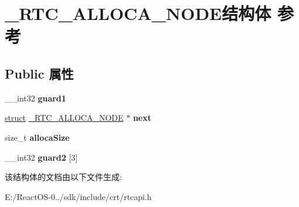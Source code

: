 \hypertarget{struct___r_t_c___a_l_l_o_c_a___n_o_d_e}{}\section{\+\_\+\+R\+T\+C\+\_\+\+A\+L\+L\+O\+C\+A\+\_\+\+N\+O\+D\+E结构体 参考}
\label{struct___r_t_c___a_l_l_o_c_a___n_o_d_e}
\subsection*{Public 属性}
\begin{DoxyCompactItemize}
\item 
\mbox{\label{struct___r_t_c___a_l_l_o_c_a___n_o_d_e_a725180efb9e8d2747a1202797eb1bbc5}} 
\+\_\+\+\_\+int32 {\bfseries guard1}
\item 
\mbox{\label{struct___r_t_c___a_l_l_o_c_a___n_o_d_e_a77f071fa3b7aed02e20b3eea51f4ad19}} 
\hyperlink{interfacestruct}{struct} \hyperlink{struct___r_t_c___a_l_l_o_c_a___n_o_d_e}{\+\_\+\+R\+T\+C\+\_\+\+A\+L\+L\+O\+C\+A\+\_\+\+N\+O\+DE} $\ast$ {\bfseries next}
\item 
\mbox{\label{struct___r_t_c___a_l_l_o_c_a___n_o_d_e_ae011ff69abc5bd39b4d0a97ca0f150c8}} 
size\+\_\+t {\bfseries alloca\+Size}
\item 
\mbox{\label{struct___r_t_c___a_l_l_o_c_a___n_o_d_e_a4e9c84c11a4474da8fcd537990a8ce7c}} 
\+\_\+\+\_\+int32 {\bfseries guard2} \mbox{[}3\mbox{]}
\end{DoxyCompactItemize}


该结构体的文档由以下文件生成\+:\begin{DoxyCompactItemize}
\item 
E\+:/\+React\+O\+S-\/0../sdk/include/crt/rtcapi.\+h\end{DoxyCompactItemize}
